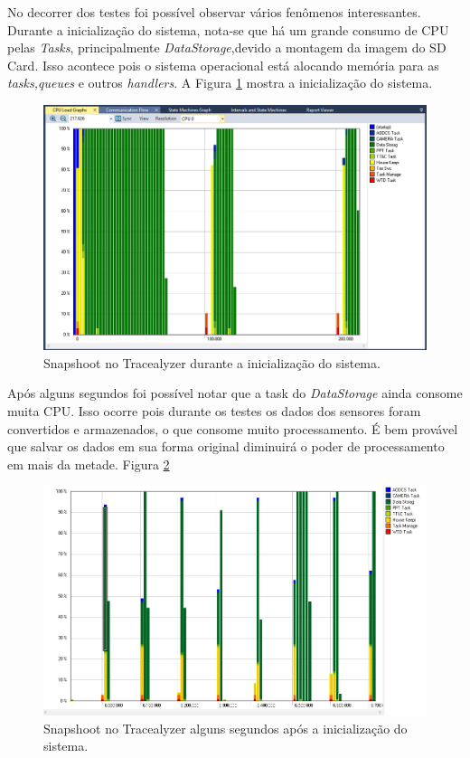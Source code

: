 No decorrer dos testes foi possível observar vários fenômenos interessantes. Durante a inicialização do sistema, nota-se que há um grande consumo de CPU pelas \textit{Tasks}, principalmente \textit{DataStorage},devido a montagem da imagem do SD Card. Isso acontece pois o sistema operacional está alocando memória para as \textit{tasks,queues} e outros \textit{handlers}. A Figura \ref{trace_snapshoot_1} mostra a inicialização do sistema.

\begin{figure}[h]
	\centering
	\caption{Snapshoot no Tracealyzer durante a inicialização do sistema.}
	\includegraphics[keepaspectratio=true,scale=0.51]{figuras/trace_snapshoot_1.PNG}
	
	\label{trace_snapshoot_1}
\end{figure}

Após alguns segundos foi possível notar que a task do \textit{DataStorage} ainda consome muita CPU. Isso ocorre pois durante os testes os dados dos sensores foram convertidos e armazenados, o que consome muito processamento. É bem provável que salvar os dados em sua forma original diminuirá o poder de processamento em mais da metade. Figura \ref{trace_snapshoot_2}


\begin{figure}[h]
	\centering
	\caption{Snapshoot no Tracealyzer alguns segundos após a inicialização do sistema.}
	\includegraphics[keepaspectratio=true,scale=0.51]{figuras/trace_snapshoot_2.PNG}
	
	\label{trace_snapshoot_2}
\end{figure}

